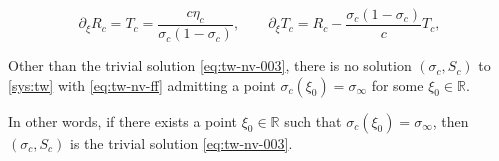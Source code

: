\documentclass[10pt,a4paper]{amsart}
\begin{document}
    \begin{equation}
    \label{eq:tw-nv-005}
        \partial_\xi R_c = T_c  = \frac{c \eta_c}{\sigma_c(1-\sigma_c)}, \qquad \partial_\xi T_c %
        = R_c - \frac{\sigma_c (1-\sigma_c)}{c}T_c, 
    \end{equation}

\begin{lemma}
    \label{lm:no-crossing-asymptotics}
    Other than the trivial solution \eqref{eq:tw-nv-003}, there is no solution $ (\sigma_c, S_c) $ to \eqref{sys:tw} with \eqref{eq:tw-nv-ff} admitting a point $ \sigma_c (\xi_0) = \sigma_\infty $ for some $ \xi_0 \in \mathbb R $.

    In other words, 
    if there exists a point $ \xi_0 \in \mathbb R $ such that $ \sigma_c(\xi_0) = \sigma_\infty $, then $ (\sigma_c,S_c) $ is the trivial solution \eqref{eq:tw-nv-003}. 
\end{lemma}
\end{document}
